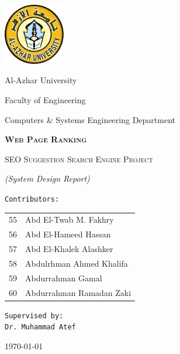 \documentclass{scrartcl}
\begin{document}
\begin{titlepage}
	\centering
	\includegraphics[width=0.2\textwidth]{al-azhar.png}\par\vspace{12pt}
	{\LARGE Al-Azhar University \par}\vspace{3pt}
	{\Large Faculty of Engineering \par}
	{\Large Computers \& Systems Engineering Department \par}\vspace{12pt}
	\vfill
	{\huge\bfseries\scshape Web Page Ranking \par}\vspace{8pt}
  {\scshape SEO Suggestion Search Engine Project \par}\vspace{8pt}
  {\itshape (System Design Report) \par}
	\vfill
	{\Large\texttt{Contributors:} \\[12pt]
    \Large\itshape\ttfamily
    \begin{tabular}{ll}
      55 & Abd El-Twab M. Fakhry \\
      56 & Abd El-Hameed Hassan \\
      57 & Abd El-Khalek Alashker \\
      58 & Abdulrhman Ahmed Khalifa \\
      59 & Abdurrahman Gamal \\
      60 & Abdurrahman Ramadan Zaki \\
    \end{tabular}
  }\par
	\vspace{1cm}
	\vfill
  {\Large\texttt{Supervised by:} \\
	\texttt{Dr. Muhammad Atef} \par}
  \vfill
  {\large \today \par}
\end{titlepage}

\newpage

\tableofcontents

\newpage
\end{document}
